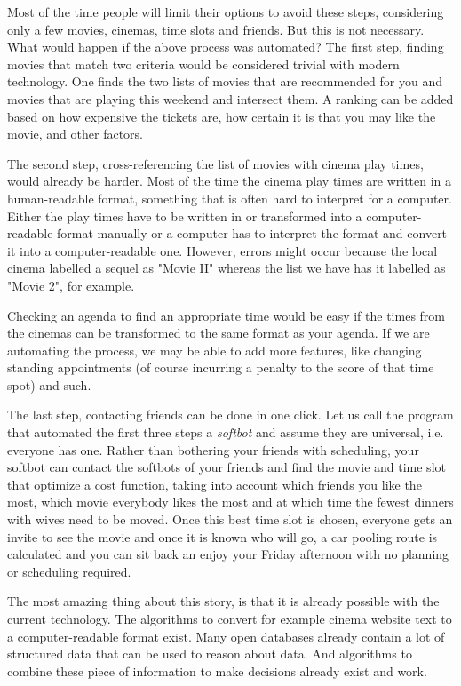 \documentclass{article}
\begin{document}
 Most of the time people will limit their options to avoid these steps, considering only a few movies, cinemas, time slots and friends. But this is not necessary. What would happen if the above process was automated? The first step, finding movies that match two criteria would be considered trivial with modern technology. One finds the two lists of movies that are recommended for you and movies that are playing this weekend and intersect them. A ranking can be added based on how expensive the tickets are, how certain it is that you may like the movie, and other factors.
 
 The second step, cross-referencing the list of movies with cinema play times, would already be harder. Most of the time the cinema play times are written in a human-readable format, something that is often hard to interpret for a computer. Either the play times have to be written in or transformed into a computer-readable format manually or a computer has to interpret the format and convert it into a computer-readable one. However, errors might occur because the local cinema labelled a sequel as "Movie II" whereas the list we have has it labelled as "Movie 2", for example.
 
 Checking an agenda to find an appropriate time would be easy if the times from the cinemas can be transformed to the same format as your agenda. If we are automating the process, we may be able to add more features, like changing standing appointments (of course incurring a penalty to the score of that time spot) and such.
 
 The last step, contacting friends can be done in one click. Let us call the program that automated the first three steps a \emph{softbot} and assume they are universal, i.e. everyone has one. Rather than bothering your friends with scheduling, your softbot can contact the softbots of your friends and find the movie and time slot that optimize a cost function, taking into account which friends you like the most, which movie everybody likes the most and at which time the fewest dinners with wives need to be moved. Once this best time slot is chosen, everyone gets an invite to see the movie and once it is known who will go, a car pooling route is calculated and you can sit back an enjoy your Friday afternoon with no planning or scheduling required.
 
 The most amazing thing about this story, is that it is already possible with the current technology. The algorithms to convert for example cinema website text to a computer-readable format exist. Many open databases already contain a lot of structured data that can be used to reason about data. And algorithms to combine these piece of information to make decisions already exist and work.
 
\end{document}
